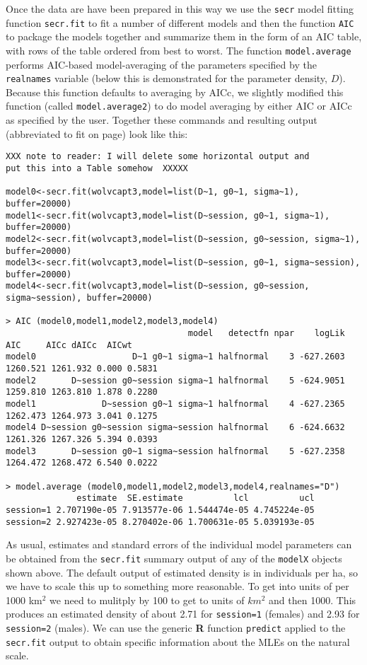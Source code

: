 Once the data are have been prepared in this way we use the
\mbox{\tt secr} model fitting function \mbox{\tt secr.fit} to fit a
number of different models and then the function \mbox{\tt AIC} to
package the models together and summarize them in the form of an AIC
table, with rows of the table ordered from best to worst. The function
\mbox{\tt model.average} performs AIC-based model-averaging of the
parameters specified by the \mbox{\tt realnames} variable (below this
is demonstrated for the parameter density, $D$).  Because this
function defaults to averaging by AICc, we slightly modified
this function (called \mbox{\tt model.average2}) to do model averaging
by either  AIC or AICc as specified by the user. Together
these commands and resulting output (abbreviated to fit on page) look like this:
{\small
\begin{verbatim}
XXX note to reader: I will delete some horizontal output and
put this into a Table somehow  XXXXX

model0<-secr.fit(wolvcapt3,model=list(D~1, g0~1, sigma~1), buffer=20000)
model1<-secr.fit(wolvcapt3,model=list(D~session, g0~1, sigma~1), buffer=20000)
model2<-secr.fit(wolvcapt3,model=list(D~session, g0~session, sigma~1), buffer=20000)
model3<-secr.fit(wolvcapt3,model=list(D~session, g0~1, sigma~session), buffer=20000)
model4<-secr.fit(wolvcapt3,model=list(D~session, g0~session, sigma~session), buffer=20000)

> AIC (model0,model1,model2,model3,model4)
                                    model   detectfn npar    logLik      AIC     AICc dAICc  AICwt
model0                   D~1 g0~1 sigma~1 halfnormal    3 -627.2603 1260.521 1261.932 0.000 0.5831
model2       D~session g0~session sigma~1 halfnormal    5 -624.9051 1259.810 1263.810 1.878 0.2280
model1             D~session g0~1 sigma~1 halfnormal    4 -627.2365 1262.473 1264.973 3.041 0.1275
model4 D~session g0~session sigma~session halfnormal    6 -624.6632 1261.326 1267.326 5.394 0.0393
model3       D~session g0~1 sigma~session halfnormal    5 -627.2358 1264.472 1268.472 6.540 0.0222

> model.average (model0,model1,model2,model3,model4,realnames="D")
              estimate  SE.estimate          lcl          ucl
session=1 2.707190e-05 7.913577e-06 1.544474e-05 4.745224e-05
session=2 2.927423e-05 8.270402e-06 1.700631e-05 5.039193e-05
\end{verbatim}
}
As usual, estimates and standard errors of the individual model
parameters can be obtained from the \mbox{\tt secr.fit} summary output
of any of the \mbox{\tt modelX} objects shown above.
The default output of estimated density is in individuals per ha, so
we have to scale this up to something more reasonable. To get into
units of per 1000 km$^2$ we need to mulitply by 100 to get to units of
$km^2$ and then 1000. This produces an estimated density of
about 2.71 for \mbox{\tt session=1} (females) and 2.93 for
\mbox{\tt session=2} (males).  We can use the generic {\bf R} function
\mbox{\tt predict} applied to the \mbox{\tt secr.fit} output to obtain
 specific information about the MLEs on the natural scale.

